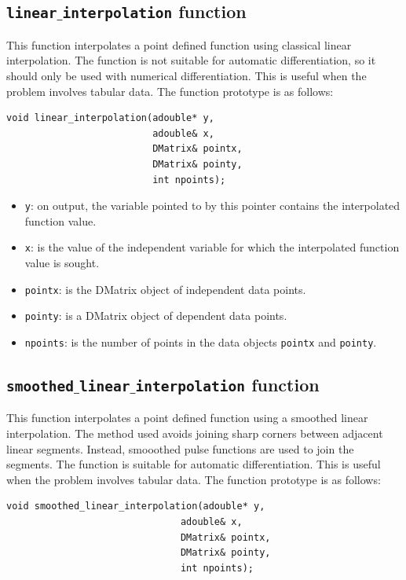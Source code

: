 \documentclass[a4paper,11pt]{report}    %
\begin{document}
\subsection{ \texttt{linear$\_$interpolation}  function}

This function interpolates a point defined function using classical linear interpolation. The function is not suitable for automatic differentiation,
so it should only be used with numerical differentiation.
This is useful when the problem involves tabular data. The function prototype is as follows:

\begin{verbatim}
void linear_interpolation(adouble* y, 
                          adouble& x, 
                          DMatrix& pointx, 
                          DMatrix& pointy, 
                          int npoints);
\end{verbatim}


\begin{itemize}
 \item \verb|y|: on output, the variable pointed to by this pointer contains the interpolated function value.
 \item \verb|x|: is the value of the independent variable for which the interpolated function value is sought.
 \item \verb|pointx|:  is the DMatrix object of independent data points.
 \item \verb|pointy|: is a DMatrix object of dependent data points.
 \item \verb|npoints|: is the number of points in the data objects \verb|pointx| and \verb|pointy|.
\end{itemize}



\subsection{ \texttt{smoothed$\_$linear$\_$interpolation}  function}

This function interpolates a point defined function using a smoothed linear interpolation. The method used avoids joining sharp corners 
between adjacent linear segments. Instead, smooothed pulse functions are used to join the segments. The function is suitable for automatic differentiation. 
This is useful when the problem involves tabular data. The function prototype is as follows:

\begin{verbatim}
void smoothed_linear_interpolation(adouble* y, 
                               adouble& x, 
                               DMatrix& pointx, 
                               DMatrix& pointy, 
                               int npoints);
\end{verbatim}
\end{document}
